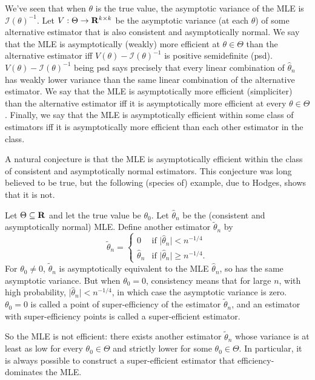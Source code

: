 \documentclass[11pt,letterpaper,reqno,oneside]{article}
\begin{document}
We've seen that when $\theta$ is the true value, the asymptotic variance of the MLE is $\mathcal{I}(\theta)^{-1}$. Let $V : \Theta \to \mathbf{R}^{k \times k}$ be the asymptotic variance (at each $\theta$) of some alternative estimator that is also consistent and asymptotically normal. We say that the MLE is asymptotically (weakly) more efficient at $\theta \in \Theta$ than the alternative estimator iff $V(\theta) - \mathcal{I}(\theta)^{-1}$ is positive semidefinite (psd). $V(\theta) - \mathcal{I}(\theta)^{-1}$ being psd says precisely that every linear combination of $\widehat{\theta}_n$ has weakly lower variance than the same linear combination of the alternative estimator. We say that the MLE is asymptotically more efficient (simpliciter) than the alternative estimator iff it is asymptotically more efficient at every $\theta \in \Theta$. Finally, we say that the MLE is asymptotically efficient within some class of estimators iff it is asymptotically more efficient than each other estimator in the class.

A natural conjecture is that the MLE is asymptotically efficient within the class of consistent and asymptotically normal estimators. This conjecture was long believed to be true, but the following (species of) example, due to Hodges, shows that it is not.
%
\begin{example}
	Let $\Theta \subseteq \mathbf{R}$ and let the true value be $\theta_0$. Let $\widehat{\theta}_n$ be the (consistent and asymptotically normal) MLE. Define another estimator $\widetilde{\theta}_n$ by
	\begin{equation*}
		\widetilde{\theta}_n = \begin{cases}
			0 
			&\text{if $\big\lvert \widehat{\theta}_n \big\rvert < n^{-1/4}$}
			\\
			\widehat{\theta}_n 
			&\text{if $\big\lvert \widehat{\theta}_n \big\rvert \geq n^{-1/4}$} .
		\end{cases}
	\end{equation*}
	For $\theta_0 \neq 0$, $\widetilde{\theta}_n$ is asymptotically equivalent to the MLE $\widehat{\theta}_n$, so has the same asymptotic variance. But when $\theta_0=0$, consistency means that for large $n$, with high probability, $\lvert \widehat{\theta}_n \rvert < n^{-1/4}$, in which case the asymptotic variance is zero. $\theta_0=0$ is called a point of super-efficiency of the estimator $\widetilde{\theta}_n$, and an estimator with super-efficiency points is called a super-efficient estimator.

	So the MLE is not efficient: there exists another estimator $\widetilde{\theta}_n$ whose variance is at least as low for every $\theta_0 \in \Theta$ and strictly lower for some $\theta_0 \in \Theta$. In particular, it is always possible to construct a super-efficient estimator that efficiency-dominates the MLE.
\end{example}
\end{document}
